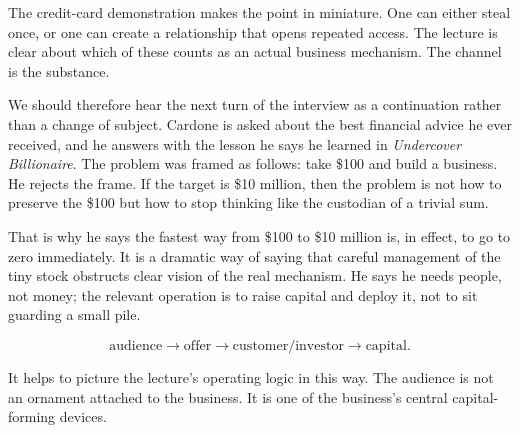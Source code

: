 The credit-card demonstration makes the point in miniature. One can either steal once, or one can create a relationship that opens repeated access. The lecture is clear about which of these counts as an actual business mechanism. The channel is the substance.

We should therefore hear the next turn of the interview as a continuation rather than a change of subject. Cardone is asked about the best financial advice he ever received, and he answers with the lesson he says he learned in \emph{Undercover Billionaire}. The problem was framed as follows: take \$100 and build a business. He rejects the frame. If the target is \$10 million, then the problem is not how to preserve the \$100 but how to stop thinking like the custodian of a trivial sum.

That is why he says the fastest way from \$100 to \$10 million is, in effect, to go to zero immediately. It is a dramatic way of saying that careful management of the tiny stock obstructs clear vision of the real mechanism. He says he needs people, not money; the relevant operation is to raise capital and deploy it, not to sit guarding a small pile.

\begin{equation}
\text{audience} \to \text{offer} \to \text{customer/investor} \to \text{capital}.
\end{equation}

\begin{figure}[h]
\centering
{}
\end{figure}

It helps to picture the lecture's operating logic in this way. The audience is not an ornament attached to the business. It is one of the business's central capital-forming devices.

